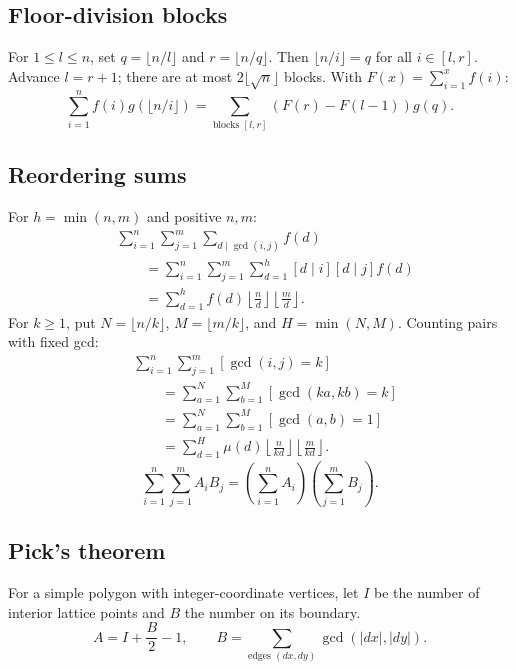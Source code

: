 \subsection{Floor-division blocks}
For $1\le l\le n$, set $q=\lfloor n/l\rfloor$ and
$r=\lfloor n/q\rfloor$. Then $\lfloor n/i\rfloor=q$ for all $i\in[l,r]$.
Advance $l=r+1$; there are at most $2\lfloor\sqrt n\rfloor$ blocks.
With $F(x)=\sum_{i=1}^x f(i)$:
\[
\sum_{i=1}^n f(i)g(\lfloor n/i\rfloor)
=\sum_{\text{blocks }[l,r]}(F(r)-F(l-1))g(q).
\]

\subsection{Reordering sums}
For $h=\min(n,m)$ and positive $n,m$:
\[
\begin{aligned}
&\sum_{i=1}^n\sum_{j=1}^m\sum_{d\mid\gcd(i,j)} f(d)\\
&\qquad=\sum_{i=1}^n\sum_{j=1}^m\sum_{d=1}^{h}[d\mid i][d\mid j]f(d)\\
&\qquad=\sum_{d=1}^{h}f(d)\left\lfloor\frac nd\right\rfloor
\left\lfloor\frac md\right\rfloor.
\end{aligned}
\]
For $k\ge1$, put $N=\lfloor n/k\rfloor$, $M=\lfloor m/k\rfloor$,
and $H=\min(N,M)$. Counting pairs with fixed gcd:
\[
\begin{aligned}
&\sum_{i=1}^n\sum_{j=1}^m[\gcd(i,j)=k]\\
&\qquad=\sum_{a=1}^{N}\sum_{b=1}^{M}[\gcd(ka,kb)=k]\\
&\qquad=\sum_{a=1}^{N}\sum_{b=1}^{M}[\gcd(a,b)=1]\\
&\qquad=\sum_{d=1}^{H}\mu(d)\left\lfloor\frac n{kd}\right\rfloor
\left\lfloor\frac m{kd}\right\rfloor.
\end{aligned}
\]
\[
\sum_{i=1}^n\sum_{j=1}^m A_iB_j
=\left(\sum_{i=1}^n A_i\right)\left(\sum_{j=1}^m B_j\right).
\]

\subsection{Pick's theorem}
For a simple polygon with integer-coordinate vertices, let $I$ be
the number of interior lattice points and $B$ the number on its boundary.
\[
A=I+\frac B2-1,\qquad
B=\sum_{\text{edges }(dx,dy)}\gcd(|dx|,|dy|).
\]
